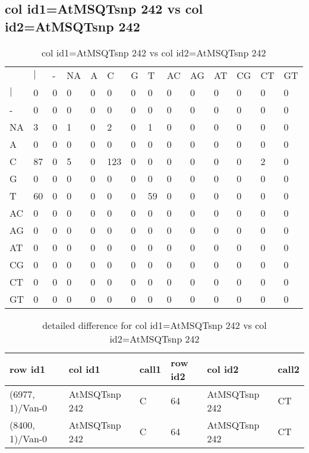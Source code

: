 \subsection{col id1=AtMSQTsnp 242 vs col id2=AtMSQTsnp 242}
\begin{center}
\begin{longtable}{|l|l|l|l|l|l|l|l|l|l|l|l|l|l|}
\caption{col id1=AtMSQTsnp 242 vs col id2=AtMSQTsnp 242} \label{table_dm798}\\
\hline
\\
\hline
&$|$&-&NA&A&C&G&T&AC&AG&AT&CG&CT&GT\\
$|$&0&0&0&0&0&0&0&0&0&0&0&0&0\\
-&0&0&0&0&0&0&0&0&0&0&0&0&0\\
NA&3&0&1&0&2&0&1&0&0&0&0&0&0\\
A&0&0&0&0&0&0&0&0&0&0&0&0&0\\
C&87&0&5&0&123&0&0&0&0&0&0&2&0\\
G&0&0&0&0&0&0&0&0&0&0&0&0&0\\
T&60&0&0&0&0&0&59&0&0&0&0&0&0\\
AC&0&0&0&0&0&0&0&0&0&0&0&0&0\\
AG&0&0&0&0&0&0&0&0&0&0&0&0&0\\
AT&0&0&0&0&0&0&0&0&0&0&0&0&0\\
CG&0&0&0&0&0&0&0&0&0&0&0&0&0\\
CT&0&0&0&0&0&0&0&0&0&0&0&0&0\\
GT&0&0&0&0&0&0&0&0&0&0&0&0&0\\
\hline
\end{longtable}
\end{center}

\begin{center}
\begin{longtable}{|l|l|l|l|l|l|}
\caption{detailed difference for col id1=AtMSQTsnp 242 vs col id2=AtMSQTsnp 242} \label{table_dm799}\\
\hline
row id1&col id1&call1&row id2&col id2&call2\\
\hline
(6977, 1)/Van-0&AtMSQTsnp 242&C&64&AtMSQTsnp 242&CT\\
(8400, 1)/Van-0&AtMSQTsnp 242&C&64&AtMSQTsnp 242&CT\\
\hline
\end{longtable}
\end{center}

